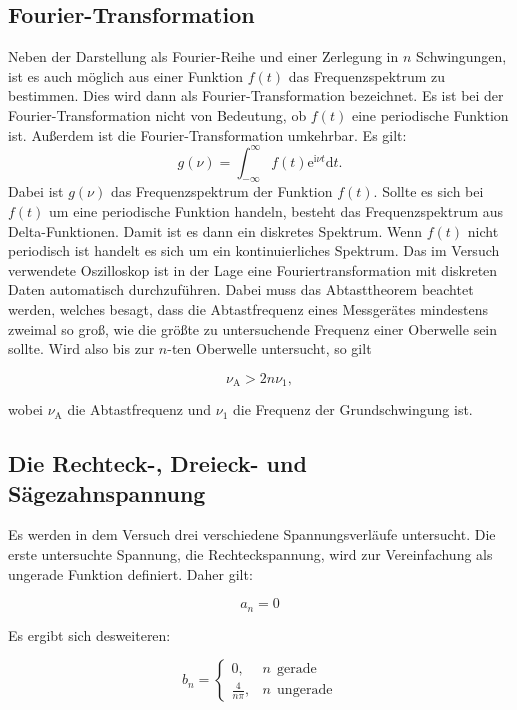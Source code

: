 \documentclass[
  bibliography=totoc,     %
  captions=tableheading,  %
  titlepage=firstiscover, %
]{scrartcl}
\begin{document}
\subsection{Fourier-Transformation}
Neben der Darstellung als Fourier-Reihe und einer Zerlegung in $n$ Schwingungen,
ist es auch möglich aus einer Funktion $f(t)$ das Frequenzspektrum zu bestimmen.
Dies wird dann als Fourier-Transformation bezeichnet. Es ist bei der Fourier-Transformation
nicht von Bedeutung, ob $f(t)$ eine periodische Funktion ist. Außerdem ist die
Fourier-Transformation umkehrbar. Es gilt:
\begin{equation}
	g(\nu)=\int_{-\infty}^{\infty}f(t)\mathup{e}^{\mathup{i}\nu t}\mathup{d}t.
	\label{fourier_trafo}
\end{equation}
Dabei ist $g(\nu)$ das Frequenzspektrum der Funktion $f(t)$. Sollte es sich bei
$f(t)$ um eine periodische Funktion handeln, besteht das Frequenzspektrum aus
Delta-Funktionen. Damit ist es dann ein diskretes Spektrum. Wenn $f(t)$ nicht
periodisch ist handelt es sich um ein kontinuierliches Spektrum. Das im Versuch
verwendete Oszilloskop ist in der Lage eine Fouriertransformation mit diskreten
Daten automatisch durchzuführen. Dabei muss das Abtasttheorem beachtet werden,
welches besagt, dass die Abtastfrequenz eines Messgerätes mindestens zweimal so
groß, wie die größte zu untersuchende Frequenz einer Oberwelle sein sollte. Wird
also bis zur $n$-ten Oberwelle untersucht, so gilt

\begin{equation}
	\nu_{\mathup{A}}>2n\nu_1,
	\label{abtasttheorem}
\end{equation}

wobei $\nu_{\mathup{A}}$ die Abtastfrequenz und $\nu_1$ die Frequenz der
Grundschwingung ist.
\subsection{Die Rechteck-, Dreieck- und Sägezahnspannung}
\label{formeln}
Es werden in dem Versuch drei verschiedene Spannungsverläufe untersucht.
Die erste untersuchte Spannung, die Rechteckspannung, wird zur Vereinfachung
als ungerade Funktion definiert. Daher gilt:

\begin{equation}
	a_n=0
\end{equation}

Es ergibt sich desweiteren:

\begin{equation}
	b_n=
	\begin{cases}
		0,  & n \:\:\mathup{gerade}\\
		\frac{4}{n\pi}, &n \:\:\mathup{ungerade}
	\end{cases}
\label{rechteck}
\end{equation}
\end{document}
